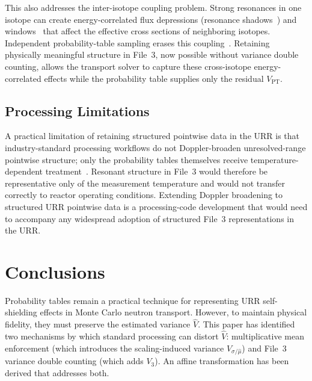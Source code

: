 \documentclass{style/nseJournal}
\begin{document}
This also addresses the inter-isotope coupling problem. Strong resonances in one isotope can create energy-correlated flux depressions (resonance shadows~\cite{Carlvik1967Dancoff}) and windows~\cite{Furuta1987WindowEffect} that affect the effective cross sections of neighboring isotopes. Independent probability-table sampling erases this coupling~\cite{Descalle2023URRPT}. Retaining physically meaningful structure in File~3, now possible without variance double counting, allows the transport solver to capture these cross-isotope energy-correlated effects while the probability table supplies only the residual $V_{\mathrm{PT}}$.

\subsection{Processing Limitations}
\label{ssec:processing-limitations}

A practical limitation of retaining structured pointwise data in the URR is that industry-standard processing workflows do not Doppler-broaden unresolved-range pointwise structure; only the probability tables themselves receive temperature-dependent treatment~\cite{Cullen2012ENDF370,TrellueLittle2008ENDF70Processing}. Resonant structure in File~3 would therefore be representative only of the measurement temperature and would not transfer correctly to reactor operating conditions. Extending Doppler broadening to structured URR pointwise data is a processing-code development that would need to accompany any widespread adoption of structured File~3 representations in the URR.

\section{Conclusions}

Probability tables remain a practical technique for representing URR self-shielding effects in Monte Carlo neutron transport. However, to maintain physical fidelity, they must preserve the estimated variance $\hat{V}$. This paper has identified two mechanisms by which standard processing can distort $\hat{V}$: multiplicative mean enforcement (which introduces the scaling-induced variance $V_{\sigma/\hat{\mu}}$) and File~3 variance double counting (which adds $V_3$). An affine transformation has been derived that addresses both.
\end{document}
